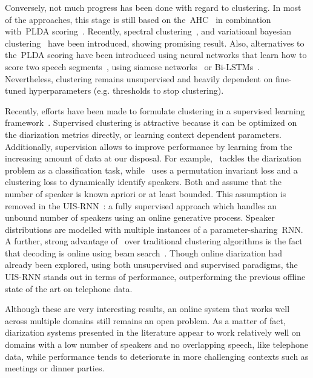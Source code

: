 \documentclass{article}
\begin{document}
Conversely, not much progress has been done with regard to clustering. In most of the approaches, this stage is still based on the~\ac{AHC}~\cite{han2008strategies} in combination with~\ac{PLDA} scoring~\cite{sell2014speaker}. Recently, spectral clustering~\cite{ning2006spectral}\cite{wang2018speaker}, and variatioanl bayesian clustering~\cite{Diez_2018,Diez2019} have been introduced, showing promising result. Also, alternatives to the~\ac{PLDA} scoring have been introduced using neural networks that learn how to score two speech segments~\cite{Chopra2005}, using siamese networks~\cite{zhu2018self} or Bi-LSTMs~\cite{Lin2019}. Nevertheless, clustering remains unsupervised and heavily dependent on fine-tuned hyperparameters (e.g. thresholds to stop clustering).

Recently, efforts have been made to formulate clustering in a supervised learning framework~\cite{Asawa2017DeepLA,Fujita_2019,zhang2019fully}. Supervised clustering is attractive because it can be optimized on the diarization metrics directly, or learning context dependent parameters. Additionally, supervision allows to improve performance by learning from the increasing amount of data at our disposal. For example,~\cite{Asawa2017DeepLA} tackles the diarization problem as a classification task, while~\cite{Fujita_2019} uses a permutation invariant loss and a clustering loss to dynamically identify speakers. Both \cite{Asawa2017DeepLA} and \cite{Fujita_2019} assume that the number of speaker is known apriori or at least bounded. This assumption is removed in the UIS-RNN~\cite{zhang2019fully}: a fully supervised approach which handles an unbound number of speakers using an online generative process. Speaker distributions are modelled with multiple instances of a parameter-sharing~\ac{RNN}. A further, strong advantage of~\cite{zhang2019fully} over traditional clustering algorithms is the fact that decoding is online using beam search~\cite{medress1977}. Though online diarization had already been explored, using both unsupervised \cite{geiger2010gmm,mansfield2018links,Dimitriadis2017DevelopingOS} and supervised \cite{Asawa2017DeepLA} paradigms, the UIS-RNN stands out in terms of performance, outperforming the previous offline state of the art on telephone data.

Although these are very interesting results, an online system that works well across multiple domains still remains an open problem. As a matter of fact, diarization systems presented in the literature appear to
work relatively well on domains with a low number of speakers and no overlapping speech, like telephone data, while performance tends to deteriorate in more challenging contexts such as meetings or dinner parties.
\end{document}
